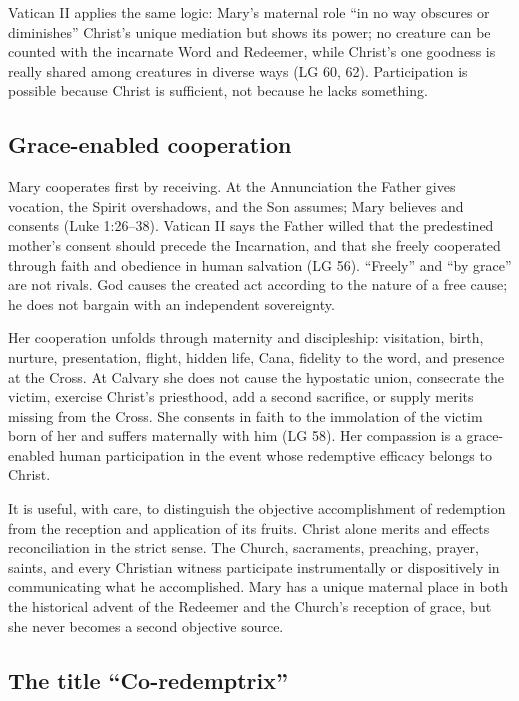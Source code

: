 Vatican II applies the same logic: Mary's maternal role ``in no way obscures or diminishes'' Christ's unique mediation but shows its power; no creature can be counted with the incarnate Word and Redeemer, while Christ's one goodness is really shared among creatures in diverse ways (LG 60, 62). Participation is possible because Christ is sufficient, not because he lacks something.

\subsection{Grace-enabled cooperation}

Mary cooperates first by receiving. At the Annunciation the Father gives vocation, the Spirit overshadows, and the Son assumes; Mary believes and consents (Luke 1:26--38). Vatican II says the Father willed that the predestined mother's consent should precede the Incarnation, and that she freely cooperated through faith and obedience in human salvation (LG 56). ``Freely'' and ``by grace'' are not rivals. God causes the created act according to the nature of a free cause; he does not bargain with an independent sovereignty.

Her cooperation unfolds through maternity and discipleship: visitation, birth, nurture, presentation, flight, hidden life, Cana, fidelity to the word, and presence at the Cross. At Calvary she does not cause the hypostatic union, consecrate the victim, exercise Christ's priesthood, add a second sacrifice, or supply merits missing from the Cross. She consents in faith to the immolation of the victim born of her and suffers maternally with him (LG 58). Her compassion is a grace-enabled human participation in the event whose redemptive efficacy belongs to Christ.

It is useful, with care, to distinguish the objective accomplishment of redemption from the reception and application of its fruits. Christ alone merits and effects reconciliation in the strict sense. The Church, sacraments, preaching, prayer, saints, and every Christian witness participate instrumentally or dispositively in communicating what he accomplished. Mary has a unique maternal place in both the historical advent of the Redeemer and the Church's reception of grace, but she never becomes a second objective source.

\subsection{The title ``Co-redemptrix''}

